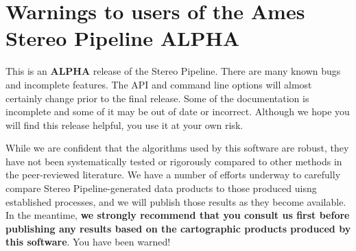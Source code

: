 \section{Warnings to users of the Ames Stereo Pipeline ALPHA}

This is an {\bf ALPHA} release of the Stereo Pipeline.  There are many
known bugs and incomplete features. The API and command line options
will almost certainly change prior to the final release.  Some of the
documentation is incomplete and some of it may be out of date or
incorrect.  Although we hope you will find this release helpful, you
use it at your own risk.

While we are confident that the algorithms used by this software are
robust, they have not been systematically tested or rigorously
compared to other methods in the peer-reviewed literature. We have a
number of efforts underway to carefully compare Stereo
Pipeline-generated data products to those produced uisng established
processes, and we will publish those results as they become available.
In the meantime, {\bf we strongly recommend that you consult us first
  before publishing any results based on the cartographic products
  produced by this software}. You have been warned!

